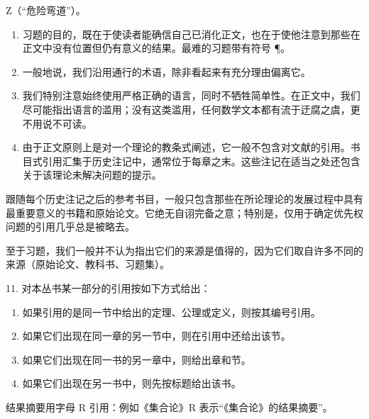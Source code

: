 Z（“危险弯道”）。

\begin{enumerate}
\def\labelenumi{\arabic{enumi}.}
\setcounter{enumi}{6}
\item
  习题的目的，既在于使读者能确信自己已消化正文，也在于使他注意到那些在正文中没有位置但仍有意义的结果。最难的习题带有符号 ¶。
\item
  一般地说，我们沿用通行的术语，除非看起来有充分理由偏离它。
\item
  我们特别注意始终使用严格正确的语言，同时不牺牲简单性。在正文中，我们尽可能指出语言的滥用；没有这类滥用，任何数学文本都有流于迂腐之虞，更不用说不可读。
\item
  由于正文原则上是对一个理论的教条式阐述，它一般不包含对文献的引用。书目式引用汇集于历史注记中，通常位于每章之末。这些注记在适当之处还包含关于该理论未解决问题的提示。
\end{enumerate}

跟随每个历史注记之后的参考书目，一般只包含那些在所论理论的发展过程中具有最重要意义的书籍和原始论文。它绝无自诩完备之意；特别是，仅用于确定优先权问题的引用几乎总是被略去。

至于习题，我们一般并不认为指出它们的来源是值得的，因为它们取自许多不同的来源（原始论文、教科书、习题集）。

11. 对本丛书某一部分的引用按如下方式给出：\par

\begin{enumerate}
\def\labelenumi{\alph{enumi})}
\item
  如果引用的是同一节中给出的定理、公理或定义，则按其编号引用。
\item
  如果它们出现在同一章的另一节中，则在引用中还给出该节。
\item
  如果它们出现在同一书的另一章中，则给出章和节。
\item
  如果它们出现在另一书中，则先按标题给出该书。
\end{enumerate}

结果摘要用字母 R 引用：例如《集合论》R 表示“《集合论》的结果摘要”。

